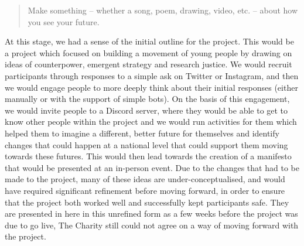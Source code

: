 \begin{quote}
Make something – whether a song, poem, drawing, video, etc. – about how you see your future.
\end{quote}

At this stage, we had a sense of the initial outline for the project. This would be a project which focused on building a movement of young people by drawing on ideas of counterpower, emergent strategy and research justice. We would recruit participants through responses to a simple ask on Twitter or Instagram, and then we would engage people to more deeply think about their initial responses (either manually or with the support of simple bots). On the basis of this engagement, we would invite people to a Discord server, where they would be able to get to know other people within the project and we would run activities for them which helped them to imagine a different, better future for themselves and identify changes that could happen at a national level that could support them moving towards these futures. This would then lead towards the creation of a manifesto that would be presented at an in-person event. Due to the changes that had to be made to the project, many of these ideas are under-conceptualised, and would have required significant refinement before moving forward, in order to ensure that the project both worked well and successfully kept participants safe. They are presented in here in this unrefined form as a few weeks before the project was due to go live, The Charity still could not agree on a way of moving forward with the project. 

